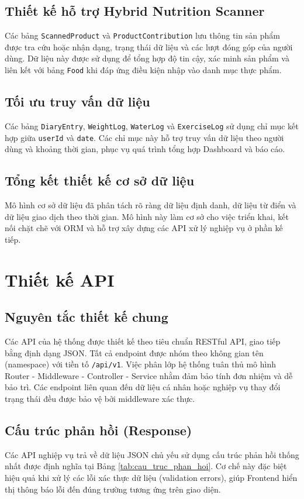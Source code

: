 \documentclass[12pt, a4paper]{report}
\begin{document}
\subsection{Thiết kế hỗ trợ Hybrid Nutrition Scanner}
Các bảng \texttt{ScannedProduct} và \texttt{ProductContribution} lưu thông tin sản phẩm được tra cứu hoặc nhận dạng, trạng thái dữ liệu và các lượt đóng góp của người dùng. Dữ liệu này được sử dụng để tổng hợp độ tin cậy, xác minh sản phẩm và liên kết với bảng \texttt{Food} khi đáp ứng điều kiện nhập vào danh mục thực phẩm.

\subsection{Tối ưu truy vấn dữ liệu}
Các bảng \texttt{DiaryEntry}, \texttt{WeightLog}, \texttt{WaterLog} và \texttt{ExerciseLog} sử dụng chỉ mục kết hợp giữa \texttt{userId} và \texttt{date}. Các chỉ mục này hỗ trợ truy vấn dữ liệu theo người dùng và khoảng thời gian, phục vụ quá trình tổng hợp Dashboard và báo cáo.

\subsection{Tổng kết thiết kế cơ sở dữ liệu}
Mô hình cơ sở dữ liệu đã phân tách rõ ràng dữ liệu định danh, dữ liệu từ điển và dữ liệu giao dịch theo thời gian. Mô hình này làm cơ sở cho việc triển khai, kết nối chặt chẽ với ORM và hỗ trợ xây dựng các API xử lý nghiệp vụ ở phần kế tiếp.

\section{Thiết kế API}
\subsection{Nguyên tắc thiết kế chung}
Các API của hệ thống được thiết kế theo tiêu chuẩn RESTful API, giao tiếp bằng định dạng JSON. Tất cả endpoint được nhóm theo không gian tên (namespace) với tiền tố \texttt{/api/v1}. Việc phân lớp hệ thống tuân thủ mô hình Router - Middleware - Controller - Service nhằm đảm bảo tính đơn nhiệm và dễ bảo trì. Các endpoint liên quan đến dữ liệu cá nhân hoặc nghiệp vụ thay đổi trạng thái đều được bảo vệ bởi middleware xác thực.

\subsection{Cấu trúc phản hồi (Response)}
Các API nghiệp vụ trả về dữ liệu JSON chủ yếu sử dụng cấu trúc phản hồi thống nhất được định nghĩa tại Bảng \ref{tab:cau_truc_phan_hoi}. Cơ chế này đặc biệt hiệu quả khi xử lý các lỗi xác thực dữ liệu (validation errors), giúp Frontend hiển thị thông báo lỗi đến đúng trường tương ứng trên giao diện.
\end{document}
